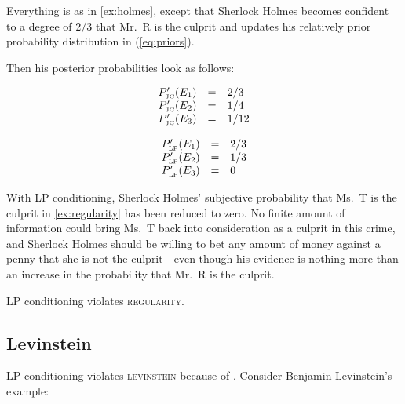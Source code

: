 \documentclass[phd,12pt,oneside]{ubcthesis}
\begin{document}
\begin{quotex}
  \label{ex:regularity} Everything is as
  in {\xample} \ref{ex:holmes}, except that Sherlock Holmes becomes
  confident to a degree of $2/3$ that Mr.\ R is the culprit and
  updates his relatively prior probability distribution in
  (\ref{eq:priors}).
\end{quotex}

{\noindent}Then his posterior probabilities look as follows:

\begin{equation}
  \label{eq:sherlockposteriorjcreg}
  \begin{array}{rcl}
  P'_{\mbox{\tiny JC}}(E_{1})&=&2/3\\
  P'_{\mbox{\tiny JC}}(E_{2})&=&1/4\\
  P'_{\mbox{\tiny JC}}(E_{3})&=&1/12
\end{array}
\end{equation}

\begin{equation}
  \label{eq:sherlockposteriorlpreg}
  \begin{array}{rcl}
  P'_{\mbox{\tiny LP}}(E_{1})&=&2/3\\
  P'_{\mbox{\tiny LP}}(E_{2})&=&1/3\\
  P'_{\mbox{\tiny LP}}(E_{3})&=&0
\end{array}
\end{equation}

{\noindent}With LP conditioning, Sherlock Holmes' subjective
probability that Ms.\ T is the culprit in {\xample}
\ref{ex:regularity} has been reduced to zero. No finite amount of
information could bring Ms.\ T back into consideration as a culprit in
this crime, and Sherlock Holmes should be willing to bet any amount of
money against a penny that she is not the culprit---even though his
evidence is nothing more than an increase in the probability that Mr.\
R is the culprit.

LP conditioning violates \textsc{regularity}.

\subsection{Levinstein}
\label{subsec:tohcahye}

LP conditioning violates \textsc{levinstein} because of 
. Consider Benjamin Levinstein's example:
\end{document}
